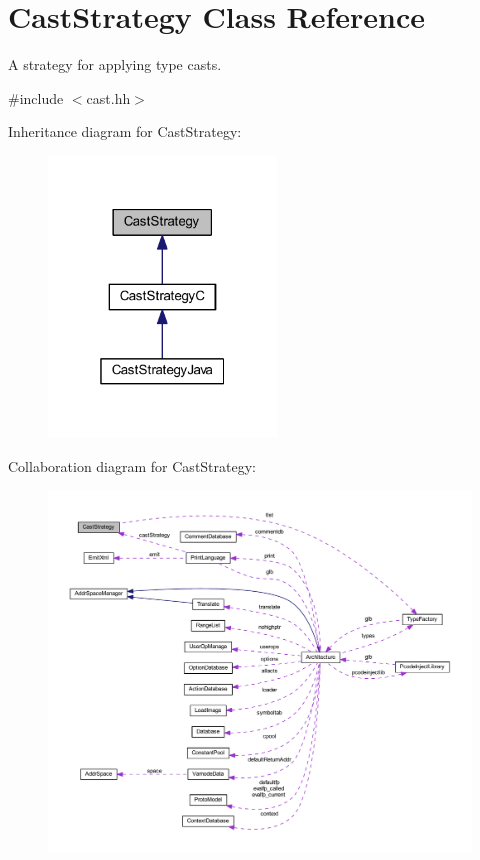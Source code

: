 \hypertarget{class_cast_strategy}{}\section{Cast\+Strategy Class Reference}
\label{class_cast_strategy}


A strategy for applying type casts.  




{\ttfamily \#include $<$cast.\+hh$>$}



Inheritance diagram for Cast\+Strategy\+:
\nopagebreak
\begin{figure}[H]
\begin{center}
\leavevmode
\includegraphics[width=172pt]{class_cast_strategy__inherit__graph}
\end{center}
\end{figure}


Collaboration diagram for Cast\+Strategy\+:
\nopagebreak
\begin{figure}[H]
\begin{center}
\leavevmode
\includegraphics[width=350pt]{class_cast_strategy__coll__graph}
\end{center}
\end{figure}
